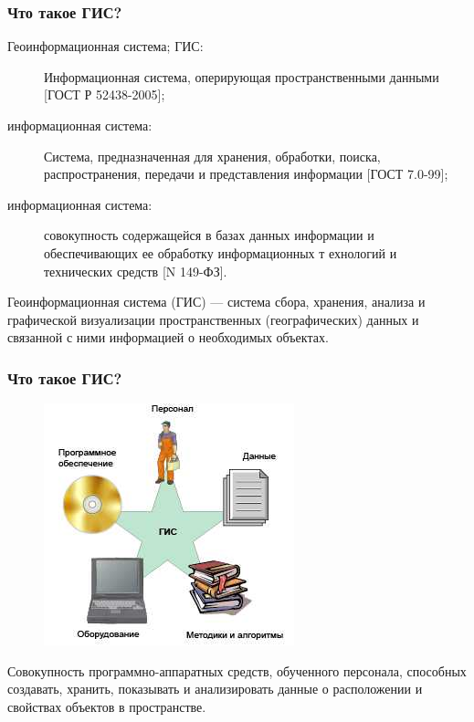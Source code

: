 
\begin{frame}
    \frametitle{Что такое ГИС?}
    \begin{description}
        \item[Геоинформационная система; ГИС:] Информационная система,
        оперирующая пространственными данными [ГОСТ Р 52438-2005];

        \item[информационная система:] Система, предназначенная для хранения,
        обработки, поиска, распространения, передачи и
        представления информации [ГОСТ 7.0-99];

        \item[информационная система:] совокупность содержащейся в базах
        данных информации и обеспечивающих ее обработку информационных т
        ехнологий и технических средств [N 149-ФЗ].

    \end{description}

    Геоинформационная система (ГИС) ---
    система сбора, хранения, анализа и графической визуализации
    пространственных (географических) данных и связанной с ними
    информацией о необходимых объектах.

\end{frame}

\begin{frame}
    \frametitle{Что такое ГИС?}
    \begin{figure}[!ht]
        \begin{center}
            \includegraphics[width=0.4\columnwidth]{./introduction/img/what-is-gis.png}
        \end{center}
    \end{figure}
    Совокупность программно-аппаратных средств, обученного персонала,
    способных создавать, хранить, показывать и анализировать данные о
    расположении и свойствах объектов в пространстве.
\end{frame}
